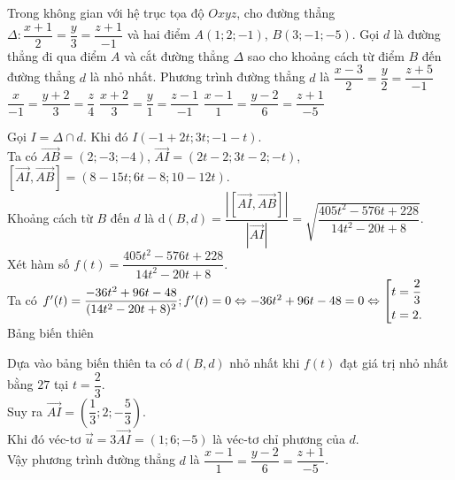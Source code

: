 \begin{ex}%
 Trong không gian với hệ trục tọa độ $Oxyz$, cho đường thẳng $\Delta: \dfrac{x + 1}{2} = \dfrac{y}{3} = \dfrac{z + 1}{-1}$ và hai điểm $A(1;2;-1)$, $B(3;-1;-5)$. Gọi $d$ là đường thẳng đi qua điểm $A$ và cắt đường thẳng $\Delta$ sao cho khoảng cách từ điểm $B$ đến đường thẳng $d$ là nhỏ nhất. Phương trình đường thẳng $d$ là
 \choice
  {$\dfrac{x - 3}{2} = \dfrac{y}{2} = \dfrac{z + 5}{-1}$}
  {$\dfrac{x}{-1} = \dfrac{y + 2}{3} = \dfrac{z}{4}$}
  {$\dfrac{x + 2}{3} = \dfrac{y}{1} = \dfrac{z - 1}{-1}$}
  {\True $\dfrac{x - 1}{1} = \dfrac{y - 2}{6} = \dfrac{z + 1}{-5}$}
 \loigiai
  {
  Gọi $I = \Delta \cap d$. Khi đó $I(-1+2t; 3t; -1-t)$.\\
  Ta có $\vec{AB} = (2;-3;-4)$, $\vec{AI} = (2t-2; 3t-2; -t)$, $\left[ \vec{AI}, \vec{AB} \right] = (8-15t; 6t-8; 10-12t)$.\\
  Khoảng cách từ $B$ đến $d$ là $\mathrm{d}(B,d) = \dfrac{\left| \left[ \vec{AI}, \vec{AB} \right] \right|}{\left| \vec{AI} \right|} = \sqrt{\dfrac{405t^2 - 576t + 228}{14t^2 - 20t + 8}}$.\\
  Xét hàm số $f(t) = \dfrac{405t^2 - 576t + 228}{14t^2 - 20t + 8}$.\\
  Ta có $f'(t) = \dfrac{-36t^2 + 96t - 48}{(14t^2 - 20t + 8)^2};f'(t) = 0 \Leftrightarrow -36t^2 + 96t - 48 = 0 \Leftrightarrow \left[\begin{aligned}& t = \dfrac{2}{3} \\& t = 2.\end{aligned}\right.$\\
  Bảng biến thiên
  \begin{center}
  \end{center}
  Dựa vào bảng biến thiên ta có $d(B,d)$ nhỏ nhất khi $f(t)$ đạt giá trị nhỏ nhất bằng $27$ tại $t = \dfrac{2}{3}$.\\
  Suy ra $\vec{AI} = \left( \dfrac{1}{3}; 2; -\dfrac{5}{3} \right)$.\\
  Khi đó véc-tơ $\vec{u} = 3 \vec{AI} = (1; 6; -5)$ là véc-tơ chỉ phương của $d$.\\
  Vậy phương trình đường thẳng $d$ là $\dfrac{x - 1}{1} = \dfrac{y - 2}{6} = \dfrac{z + 1}{-5}$.
  }
\end{ex}

